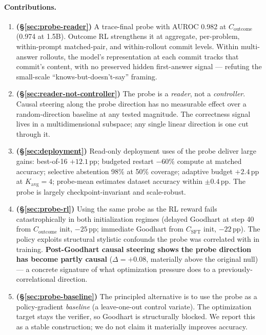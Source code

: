 \documentclass[11pt]{article}
\begin{document}
\paragraph{Contributions.}
\begin{enumerate}[leftmargin=2em,itemsep=2pt]
  \item \textbf{(\S\ref{sec:probe-reader})} A trace-final probe with AUROC 0.982 at $C_{\text{outcome}}$ (0.974 at 1.5B). Outcome RL strengthens it at aggregate, per-problem, within-prompt matched-pair, and within-rollout commit levels. Within multi-answer rollouts, the model's representation at each commit tracks that commit's content, with no preserved hidden first-answer signal --- refuting the small-scale ``knows-but-doesn't-say'' framing.
  \item \textbf{(\S\ref{sec:reader-not-controller})} The probe is a \emph{reader}, not a \emph{controller}. Causal steering along the probe direction has no measurable effect over a random-direction baseline at any tested magnitude. The correctness signal lives in a multidimensional subspace; any single linear direction is one cut through it.
  \item \textbf{(\S\ref{sec:deployment})} Read-only deployment uses of the probe deliver large gains: best-of-16 $+12.1$\,pp; budgeted restart $-60\%$ compute at matched accuracy; selective abstention 98\% at 50\% coverage; adaptive budget $+2.4$\,pp at $K_{\text{avg}}{=}4$; probe-mean estimates dataset accuracy within $\pm 0.4$\,pp. The probe is largely checkpoint-invariant and scale-robust.
  \item \textbf{(\S\ref{sec:probe-rl})} Using the same probe as the RL reward fails catastrophically in both initialization regimes (delayed Goodhart at step 40 from $C_{\text{outcome}}$ init, $-25$\,pp; immediate Goodhart from $C_{\text{SFT}}$ init, $-22$\,pp). The policy exploits structural stylistic confounds the probe was correlated with in training. \textbf{Post-Goodhart causal steering shows the probe direction has become partly causal} ($\Delta=+0.08$, materially above the original null) --- a concrete signature of what optimization pressure does to a previously-correlational direction.
  \item \textbf{(\S\ref{sec:probe-baseline})} The principled alternative is to use the probe as a policy-gradient \emph{baseline} (a leave-one-out control variate). The optimization target stays the verifier, so Goodhart is structurally blocked. We report this as a stable construction; we do not claim it materially improves accuracy.
\end{enumerate}
\end{document}
